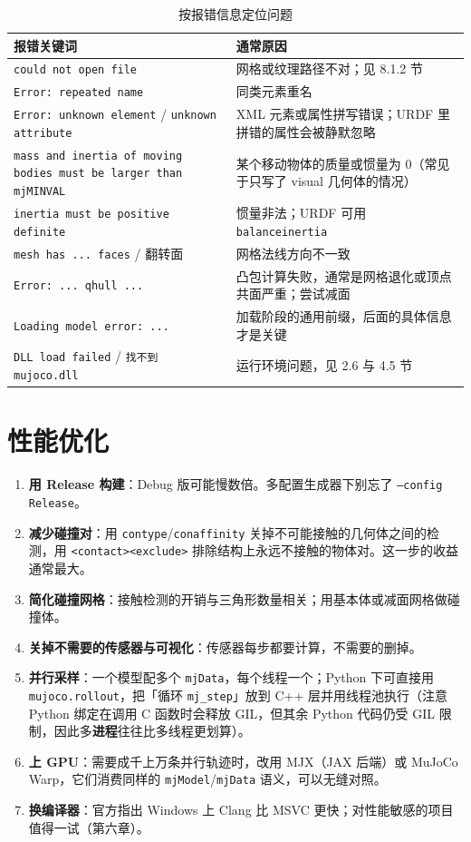 \begin{table}[H]
	\centering
	\caption{按报错信息定位问题}
	\label{tab:Debug:报错索引}
	\footnotesize
	\begin{tabular}{>{\raggedright\arraybackslash}p{5.6cm}>{\raggedright\arraybackslash}p{8.6cm}}
		\hline
		报错关键词 & 通常原因 \\
		\hline
		\texttt{could not open file} & 网格或纹理路径不对；见 8.1.2 节 \\
		\texttt{Error: repeated name} & 同类元素重名 \\
		\texttt{Error: unknown element} / \texttt{unknown attribute} & XML 元素或属性拼写错误；URDF 里拼错的属性会被静默忽略 \\
		\texttt{mass and inertia of moving bodies must be larger than mjMINVAL} & 某个移动物体的质量或惯量为 $0$（常见于只写了 visual 几何体的情况） \\
		\texttt{inertia must be positive definite} & 惯量非法；URDF 可用 \texttt{balanceinertia} \\
		\texttt{mesh has ... faces} / 翻转面 & 网格法线方向不一致 \\
		\texttt{Error: ... qhull ...} & 凸包计算失败，通常是网格退化或顶点共面严重；尝试减面 \\
		\texttt{Loading model error: ...} & 加载阶段的通用前缀，后面的具体信息才是关键 \\
		\texttt{DLL load failed} / \texttt{找不到 mujoco.dll} & 运行环境问题，见 2.6 与 4.5 节 \\
		\hline
	\end{tabular}
\end{table}

\section{性能优化}

\begin{enumerate}
	\item \textbf{用 Release 构建}：Debug 版可能慢数倍。多配置生成器下别忘了 \texttt{--config Release}。
	\item \textbf{减少碰撞对}：用 \texttt{contype}/\texttt{conaffinity} 关掉不可能接触的几何体之间的检测，用 \texttt{<contact><exclude>} 排除结构上永远不接触的物体对。这一步的收益通常最大。
	\item \textbf{简化碰撞网格}：接触检测的开销与三角形数量相关；用基本体或减面网格做碰撞体。
	\item \textbf{关掉不需要的传感器与可视化}：传感器每步都要计算，不需要的删掉。
	\item \textbf{并行采样}：一个模型配多个 \texttt{mjData}，每个线程一个；Python 下可直接用 \texttt{mujoco.rollout}，把「循环 \texttt{mj\_step}」放到 C++ 层并用线程池执行（注意 Python 绑定在调用 C 函数时会释放 GIL，但其余 Python 代码仍受 GIL 限制，因此多\textbf{进程}往往比多线程更划算）。
	\item \textbf{上 GPU}：需要成千上万条并行轨迹时，改用 MJX（JAX 后端）或 MuJoCo Warp，它们消费同样的 \texttt{mjModel}/\texttt{mjData} 语义，可以无缝对照。
	\item \textbf{换编译器}：官方指出 Windows 上 Clang 比 MSVC 更快；对性能敏感的项目值得一试（第六章）。
\end{enumerate}

